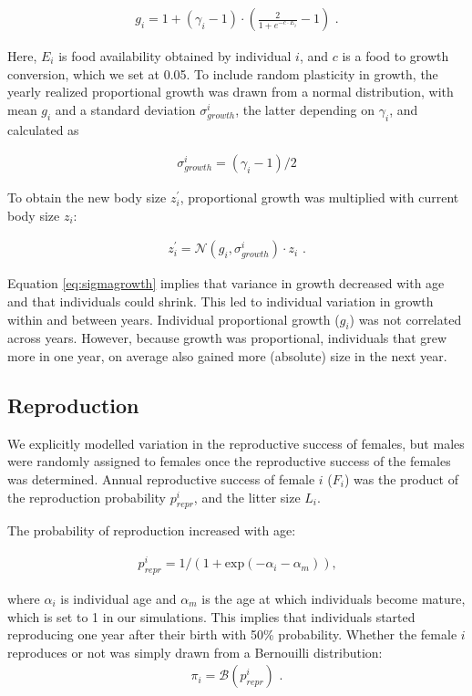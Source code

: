 \begin{align}
\label{eq:g}
g_i = 1 + (\gamma_i-1) \cdot (\frac{2}{1+e^{-c \cdot E_i}} - 1) \text{ .}
\end{align}

Here, $E_i$ is food availability obtained by individual $i$, and $c$ is a food to growth conversion, which we set at 0.05. To include random plasticity in growth, the yearly realized proportional growth was drawn from a normal distribution, with mean $g_i$ and a standard deviation $\sigma^i_{growth}$, the latter depending on $\gamma_i$, and calculated as

\begin{align}
\label{eq:sigmagrowth}
\sigma^i_{growth} = (\gamma_i-1)/2
\end{align}

To obtain the new body size $z^\prime_i$, proportional growth was multiplied with current body size $z_i$:

\begin{align}
z^\prime_i = \mathcal{N}(g_i,\sigma^i_{growth}) \cdot z_i \text{ .}
\end{align}

Equation \ref{eq:sigmagrowth} implies that variance in growth decreased with age and that individuals could shrink. This led to individual variation in growth within and between years. Individual proportional growth ($g_i$) was not correlated across years. However, because growth was proportional, individuals that grew more in one year, on average also gained more (absolute) size in the next year. 

\subsection{Reproduction} \label{app:simul:repr}
We explicitly modelled variation in the reproductive success of females, but males were randomly assigned to females once the reproductive success of the females was determined. Annual reproductive success of female $i$ ($F_i$) was the product of the reproduction probability $p^i_{repr}$, and the litter size $L_i$.

The probability of reproduction increased with age:

\begin{align}
p^i_{repr} = 1 / (1+\mathrm{exp}(-\alpha_i - \alpha_m)) \text{,}
\end{align}

where $\alpha_i$ is individual age and $\alpha_m$ is the age at which individuals become mature, which is set to 1 in our simulations. This implies that individuals started reproducing one year after their birth with 50\% probability. 
Whether the female $i$ reproduces or not was simply drawn from a Bernouilli distribution:
\begin{align}
\pi_i = \mathcal{B}(p^i_{repr}) \text{ .}
\end{align}

